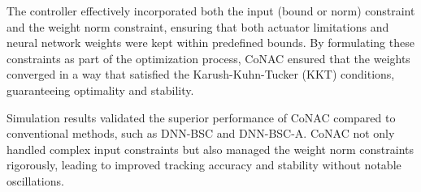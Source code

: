 The controller effectively incorporated both the input (bound or norm) constraint and the weight norm constraint, ensuring that both actuator limitations and neural network weights were kept within predefined bounds. 
By formulating these constraints as part of the optimization process, CoNAC ensured that the weights converged in a way that satisfied the Karush-Kuhn-Tucker (KKT) conditions, guaranteeing optimality and stability.

Simulation results validated the superior performance of CoNAC compared to conventional methods, such as DNN-BSC and DNN-BSC-A. 
CoNAC not only handled complex input constraints but also managed the weight norm constraints rigorously, leading to improved tracking accuracy and stability without notable oscillations.
